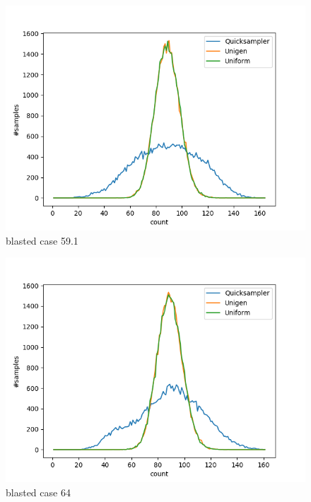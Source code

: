 \documentclass{article}
\begin{document}
\begin{figure}[!h]
    \includegraphics[scale=0.7]{DistributionFigures/Figure_case_59_1.png}
    \caption{blasted case 59.1}
\end{figure}
\begin{figure}[!h]
    \includegraphics[scale=0.7]{DistributionFigures/Figure_case_64.png}
    \caption{blasted case 64}
\end{figure}
\end{document}
